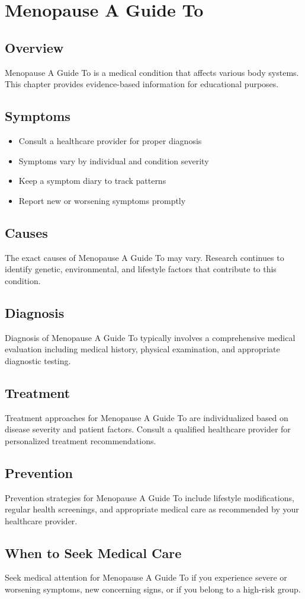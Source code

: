 \chapter{Menopause A Guide To}

\section*{Overview}
Menopause A Guide To is a medical condition that affects various body systems. This chapter provides evidence-based information for educational purposes.

\section*{Symptoms}
\begin{itemize}
  \item Consult a healthcare provider for proper diagnosis
  \item Symptoms vary by individual and condition severity
  \item Keep a symptom diary to track patterns
  \item Report new or worsening symptoms promptly
\end{itemize}

\section*{Causes}
The exact causes of Menopause A Guide To may vary. Research continues to identify genetic, environmental, and lifestyle factors that contribute to this condition.

\section*{Diagnosis}
Diagnosis of Menopause A Guide To typically involves a comprehensive medical evaluation including medical history, physical examination, and appropriate diagnostic testing.

\section*{Treatment}
Treatment approaches for Menopause A Guide To are individualized based on disease severity and patient factors. Consult a qualified healthcare provider for personalized treatment recommendations.

\section*{Prevention}
Prevention strategies for Menopause A Guide To include lifestyle modifications, regular health screenings, and appropriate medical care as recommended by your healthcare provider.

\section*{When to Seek Medical Care}
Seek medical attention for Menopause A Guide To if you experience severe or worsening symptoms, new concerning signs, or if you belong to a high-risk group.
\clearpage
